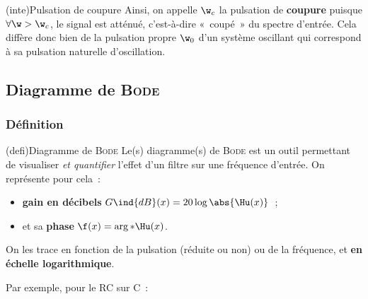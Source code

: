 \documentclass[../../main/main.tex]{subfiles}
\begin{document}
\begin{tcb*}(inte){Pulsation de coupure}
	Ainsi, on appelle $\w_c$ la pulsation de \textbf{coupure} puisque $\forall \w
		> \w_c$, le signal est atténué, c'est-à-dire «~coupé~» du spectre d'entrée.
	Cela diffère donc bien de la pulsation propre $\w_0$ d'un système oscillant
	qui correspond à sa pulsation naturelle d'oscillation.
\end{tcb*}

\subsection{Diagramme de \textsc{Bode}}

\subsubsection{Définition}
\begin{tcb*}(defi){Diagramme de \textsc{Bode}}
	Le(s) diagramme(s) de \textsc{Bode} est un outil permettant de visualiser
	\textit{et quantifier} l'effet d'un filtre sur une fréquence d'entrée. On
	représente pour cela~:
	\begin{itemize}
		\item \textbf{gain en décibels} $G\ind{dB}(x) = 20 \log \abs{\Hu(x)}$~;
		\item et sa \textbf{phase} $\f(x) = \arg*{{\Hu(x}})$.
	\end{itemize}
	\smallbreak
	On les trace en fonction de la pulsation (réduite ou non) ou de la fréquence,
	et \textbf{en échelle logarithmique}.
\end{tcb*}
Par exemple, pour le RC sur C~:
\end{document}
